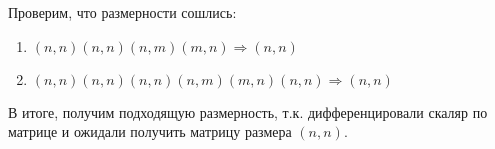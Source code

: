 \begin{solution}
    Проверим, что размерности сошлись:
    \begin{enumerate}
        \item $(n, n)(n, n)(n, m)(m, n) \Longrightarrow (n, n)$
        \item $(n, n)(n, n)(n, n)(n, m)(m, n)(n, n) \Longrightarrow (n, n)$
    \end{enumerate}
    В итоге, получим подходящую размерность, т.к. дифференцировали скаляр по матрице и ожидали получить матрицу размера $(n, n)$.
\end{solution}
